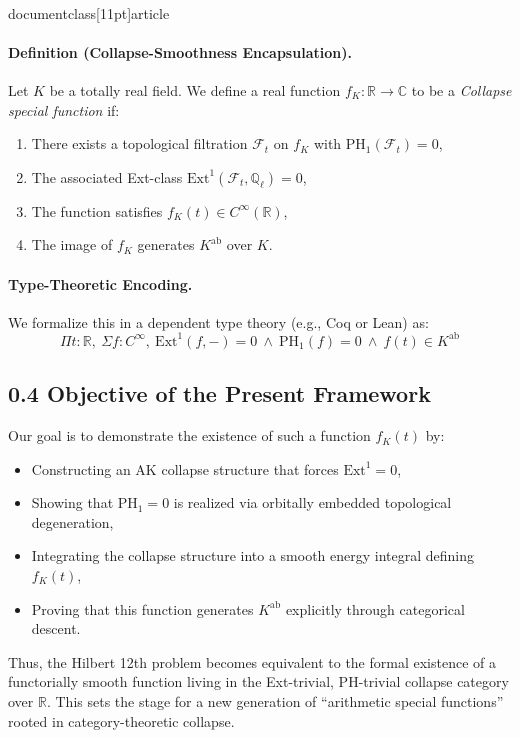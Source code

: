 \\documentclass[11pt]{article}
\begin{document}
\paragraph{Definition (Collapse-Smoothness Encapsulation).}  
Let \( K \) be a totally real field. We define a real function \( f_K: \mathbb{R} \to \mathbb{C} \) to be a \emph{Collapse special function} if:
\begin{enumerate}[label=(C\arabic*)]
    \item There exists a topological filtration \( \mathcal{F}_t \) on \( f_K \) with \( \mathrm{PH}_1(\mathcal{F}_t) = 0 \),
    \item The associated Ext-class \( \mathrm{Ext}^1(\mathcal{F}_t, \mathbb{Q}_\ell) = 0 \),
    \item The function satisfies \( f_K(t) \in C^\infty(\mathbb{R}) \),
    \item The image of \( f_K \) generates \( K^{\mathrm{ab}} \) over \( K \).
\end{enumerate}

\paragraph{Type-Theoretic Encoding.}
We formalize this in a dependent type theory (e.g., Coq or Lean) as:
\[
\boxed{
\Pi t : \mathbb{R},\ \Sigma f : C^\infty,\ \mathrm{Ext}^1(f, -) = 0\ \wedge\ \mathrm{PH}_1(f) = 0\ \wedge\ f(t) \in K^{\mathrm{ab}}
}
\]

\subsection*{0.4 Objective of the Present Framework}

Our goal is to demonstrate the existence of such a function \( f_K(t) \) by:
\begin{itemize}
    \item Constructing an AK collapse structure that forces \( \mathrm{Ext}^1 = 0 \),
    \item Showing that PH\(_1 = 0 \) is realized via orbitally embedded topological degeneration,
    \item Integrating the collapse structure into a smooth energy integral defining \( f_K(t) \),
    \item Proving that this function generates \( K^{\mathrm{ab}} \) explicitly through categorical descent.
\end{itemize}

Thus, the Hilbert 12th problem becomes equivalent to the formal existence of a functorially smooth function living in the Ext-trivial, PH-trivial collapse category over \( \mathbb{R} \). This sets the stage for a new generation of “arithmetic special functions” rooted in category-theoretic collapse.
\end{document}
